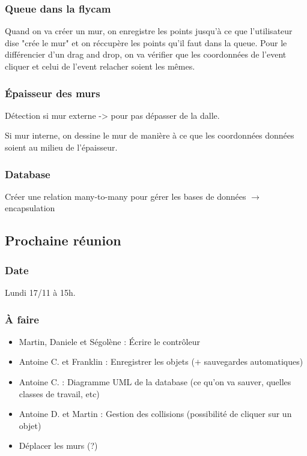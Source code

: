 \documentclass[12pt,a4paper]{article}
\begin{document}
		\subsubsection{Queue dans la flycam}
			Quand on va créer un mur, on enregistre les points jusqu'à ce que l'utilisateur dise "crée le mur" et on réccupère les points qu'il faut dans la queue. Pour le différencier d'un drag and drop, on va vérifier que les coordonnées de l'event cliquer et celui de l'event relacher soient les mêmes.
			
		\subsubsection{Épaisseur des murs}
			Détection si mur externe -> pour pas dépasser de la dalle.
			
			Si mur interne, on dessine le mur de manière à ce que les coordonnées données soient au milieu de l'épaisseur.
			
		\subsubsection{Database}
			Créer une relation many-to-many pour gérer les bases de données $\rightarrow$ encapsulation

	\subsection{Prochaine réunion}
		\subsubsection{Date}
			Lundi 17/11 à 15h. 
			
		\subsubsection{À faire}
			\begin{itemize}
				\item Martin, Daniele et Ségolène : Écrire le contrôleur
				\item Antoine C. et Franklin : Enregistrer les objets ($+$ sauvegardes automatiques)
				\item Antoine C. : Diagramme UML de la database (ce qu'on va sauver, quelles classes de travail, etc)
				\item Antoine D. et Martin : Gestion des collisions (possibilité de cliquer sur un objet) 
				\item Déplacer les murs (?) \\
			\end{itemize}
			
\end{document}
